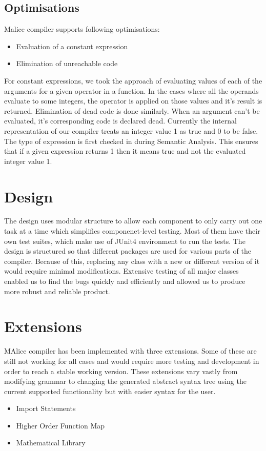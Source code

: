 \documentclass[a4wide, 11pt]{article}
\begin{document}
	\subsection{Optimisations}
		Malice compiler supports following optimisations:
		\begin{itemize}
			\item Evaluation of a constant expression
			\item Elimination of unreachable code
		\end{itemize} 
		For constant expressions, we took the approach of evaluating values of each of the arguments for a given operator 
		in a function. In the cases where all the operands evaluate to some integers, the operator is applied on those 
		values and it's result is returned. Elimination of dead code is done similarly. When an argument can't be evaluated,
		 it's corresponding code is declared dead. Currently the internal representation of our compiler treats an integer 
		 value 1 as true and 0 to be false. The type of expression is first checked in during Semantic Analysis. 
		 This ensures that if a given expression returns 1 then it means true and not the evaluated integer value 1.
	
		
\section{Design}
	The design uses modular structure to allow each component to only carry out one task at a time which simplifies 
	componenet-level testing. Most of them have their own test suites, which make use of JUnit4 environment to run 
	the tests. The design is structured so that different packages are used for various parts of the compiler. 
	Because of this, replacing any class with a new or different version of it would require minimal modifications.
	Extensive testing of all major classes enabled us to find the bugs quickly and efficiently and allowed us 
	to produce more robust and reliable product.

\section{Extensions}
	MAlice compiler has been implemented with three extensions. Some of these are still not working for all cases and would require more testing and development in order to reach a stable working version. These extensions vary vastly from modifying grammar to changing the generated abstract syntax tree using the current supported functionality but with easier syntax for the user.
	\begin{itemize}
		\item Import Statements
		\item Higher Order Function Map
		\item Mathematical Library
	\end{itemize}
\end{document}
